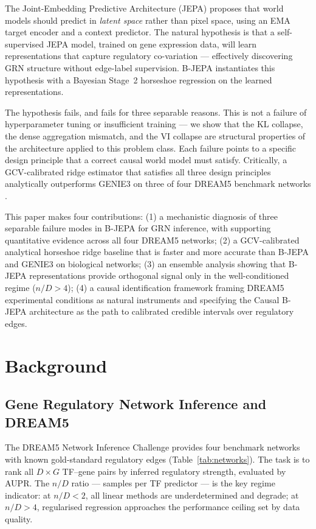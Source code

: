 \documentclass[11pt]{article}
\begin{document}
The Joint-Embedding Predictive Architecture (JEPA) \citep{lecun2022} proposes
that world models should predict in \emph{latent space} rather than pixel space,
using an EMA target encoder and a context predictor.
The natural hypothesis is that a self-supervised JEPA model, trained on
gene expression data, will learn representations that capture regulatory
co-variation --- effectively discovering GRN structure without edge-label
supervision.
B-JEPA \citep{huang2026} instantiates this hypothesis with a Bayesian Stage~2
horseshoe regression on the learned representations.

The hypothesis fails, and fails for three separable reasons.
This is not a failure of hyperparameter tuning or insufficient training --- we
show that the KL collapse, the dense aggregation mismatch, and the VI collapse
are structural properties of the architecture applied to this problem class.
Each failure points to a specific design principle that a correct causal world
model must satisfy.
Critically, a GCV-calibrated ridge estimator that satisfies all three design
principles analytically outperforms GENIE3 \citep{huynh2010} on three of four
DREAM5 benchmark networks \citep{marbach2012}.

This paper makes four contributions:
(1) a mechanistic diagnosis of three separable failure modes in B-JEPA for GRN
inference, with supporting quantitative evidence across all four DREAM5 networks;
(2) a GCV-calibrated analytical horseshoe ridge baseline that is faster and more
accurate than B-JEPA and GENIE3 on biological networks;
(3) an ensemble analysis showing that B-JEPA representations provide orthogonal
signal only in the well-conditioned regime ($n/D > 4$);
(4) a causal identification framework framing DREAM5 experimental conditions as
natural instruments and specifying the Causal B-JEPA architecture as the path
to calibrated credible intervals over regulatory edges.

\section{Background}

\subsection{Gene Regulatory Network Inference and DREAM5}

The DREAM5 Network Inference Challenge \citep{marbach2012} provides four
benchmark networks with known gold-standard regulatory edges
(Table~\ref{tab:networks}).
The task is to rank all $D \times G$ TF--gene pairs by inferred regulatory
strength, evaluated by AUPR.
The $n/D$ ratio --- samples per TF predictor --- is the key regime indicator:
at $n/D < 2$, all linear methods are underdetermined and degrade; at $n/D > 4$,
regularised regression approaches the performance ceiling set by data quality.
\end{document}

